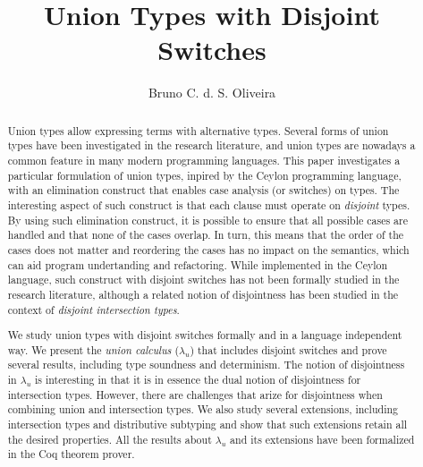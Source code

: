 \documentclass[acmsmall,review,anonymous]{acmart}\settopmatter{printfolios=true,printccs=false,printacmref=false}
\title{Union Types with Disjoint Switches}
\author{Bruno C. d. S. Oliveira}
\affiliation{
  \institution{The University of Hong Kong}            %
}
\newcommand{\cal}{$\lambda_{u}$\xspace}
\begin{document}
\begin{abstract}
Union types allow expressing terms with alternative types. Several forms of
union types have been investigated in the research literature, and
union types are nowadays a common feature in many modern programming
languages.
This paper investigates a particular formulation of union types,
inpired by the Ceylon programming language, with an elimination
construct that enables case analysis (or switches) on types.  The
interesting aspect of such construct is that each clause must operate
on \emph{disjoint} types. By using such elimination construct, it is
possible to ensure that all possible cases are
handled and that none of the cases overlap. In turn, this means that
the order of the cases does not matter and reordering the cases has no
impact on the semantics, which can aid program undertanding and
refactoring. While implemented in the Ceylon language, such construct
with disjoint switches has not been formally studied in the research
literature, although a related notion of disjointness has been studied
in the context of \emph{disjoint intersection types}.

We study union types with disjoint switches formally and in a language
independent way.  We present the \emph{union calculus} (\cal) that
includes disjoint switches and prove several results, including type
soundness and determinism. The notion of disjointness in \cal is
interesting in that it is in essence the dual notion of disjointness
for intersection types.  However, there are challenges that arize for
disjointness when combining union and intersection types.  We also
study several extensions, including intersection types and
distributive subtyping and show that such extensions retain all the
desired properties. All the results about \cal and its extensions have
been formalized in the Coq theorem prover.
\end{abstract}

\begin{comment}
    With advance types
such as intersection types and union types, it has become a challenge
to define a robust, type-safe, coherent and deterministic type
system. One often has to compromise on one property to attain
another. Union types with pattern matching on types add significant
expressive power in programming language. Function overloading can
simply be expressed in a single function with the help of union types
and case analysis on types. Intersection types incorporate many
interesting and advance features that are not easy to implement in
classical OOP model.  This study proposes a novel calculus with all
aforementioned properties for pattern matching with union types and
intersection types. The calculus proposed in this study is named as
\cal.  Outline idea in \cal is to allow only non-overlapping or
disjoint types in case expressions.
\end{comment}
\end{document}

